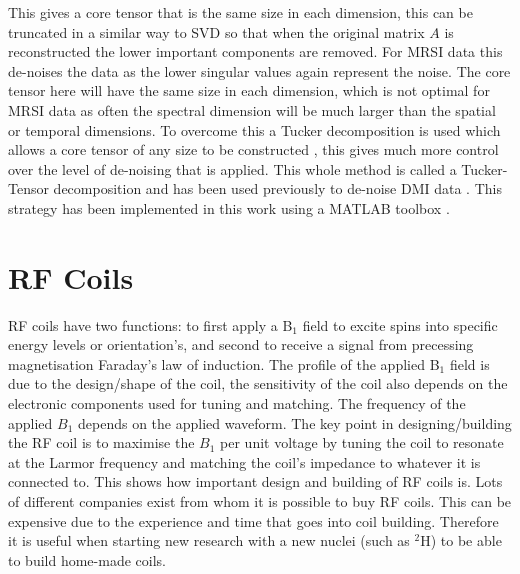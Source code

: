 \noindent This gives a core tensor that is the same size in each dimension, this can be truncated in a similar way to \ac{SVD} so that when the original matrix $A$ is reconstructed the lower important components are removed. For \ac{MRSI} data this de-noises the data as the lower singular values again represent the noise. The core tensor here will have the same size in each dimension, which is not optimal for \ac{MRSI} data as often the spectral dimension will be much larger than the spatial or temporal dimensions. To overcome this a Tucker decomposition is used which allows a core tensor of any size to be constructed \cite{Tucker1966SomeAnalysis}, this gives much more control over the level of de-noising that is applied. This whole method is called a Tucker-Tensor decomposition and has been used previously to de-noise \ac{DMI} data \cite{Kreis2020MeasuringMRI, Assmann2020InCholesterol}. This strategy has been implemented in this work using a MATLAB toolbox \cite{Bader2007EfficientTensors}.


\section{RF Coils}

\ac{RF} coils have two functions: to first apply a B$_1$ field to excite spins into specific energy levels or orientation's, and second to receive a signal from precessing magnetisation Faraday's law of induction. The profile of the applied B$_1$ field is due to the design/shape of the coil, the sensitivity of the coil also depends on the electronic components used for tuning and matching. The frequency of the applied $B_1$ depends on the applied waveform. The key point in designing/building the \ac{RF} coil is to maximise the $B_1$ per unit voltage by tuning the coil to resonate at the Larmor frequency and matching the coil's impedance to whatever it is connected to. This shows how important design and building of \ac{RF} coils is. Lots of different companies exist from whom it is possible to buy \ac{RF} coils. This can be expensive due to the experience and time that goes into coil building. Therefore it is useful when starting new research with a new nuclei (such as $^2$H) to be able to build home-made coils. 

